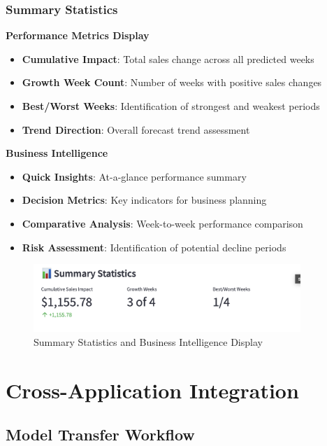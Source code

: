 \subsubsection{Summary Statistics}

\textbf{Performance Metrics Display}
\begin{itemize}
	\item \textbf{Cumulative Impact}: Total sales change across all predicted weeks
	\item \textbf{Growth Week Count}: Number of weeks with positive sales changes
	\item \textbf{Best/Worst Weeks}: Identification of strongest and weakest periods
	\item \textbf{Trend Direction}: Overall forecast trend assessment
\end{itemize}

\textbf{Business Intelligence}
\begin{itemize}
	\item \textbf{Quick Insights}: At-a-glance performance summary
	\item \textbf{Decision Metrics}: Key indicators for business planning
	\item \textbf{Comparative Analysis}: Week-to-week performance comparison
	\item \textbf{Risk Assessment}: Identification of potential decline periods
\end{itemize}

\begin{figure}[H]
	\centering
	\includegraphics[width=0.9\textwidth]{Images/05ApplicationFunctionsAndFeatures/SummaryStatistics.png}
	\caption{Summary Statistics and Business Intelligence Display}
	\label{fig:summary_statistics}
\end{figure}

\section{Cross-Application Integration}

\subsection{Model Transfer Workflow}

